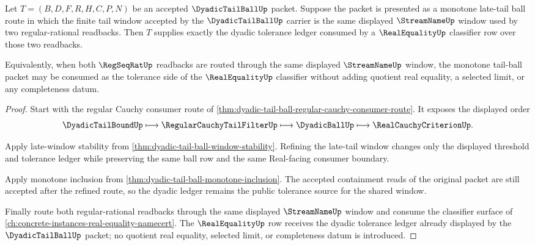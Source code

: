 \begin{theorem}
\label{thm:dyadic-tail-ball-real-equality-consumer}
Let $T=(B,D,F,R,H,C,P,N)$ be an accepted $\DyadicTailBallUp$ packet. Suppose the packet is presented as a monotone late-tail ball route in which the finite tail window accepted by the $\DyadicTailBallUp$ carrier is the same displayed $\StreamNameUp$ window used by two regular-rational readbacks. Then $T$ supplies exactly the dyadic tolerance ledger consumed by a $\RealEqualityUp$ classifier row over those two readbacks.

Equivalently, when both $\RegSeqRatUp$ readbacks are routed through the same displayed $\StreamNameUp$ window, the monotone tail-ball packet may be consumed as the tolerance side of the $\RealEqualityUp$ classifier without adding quotient real equality, a selected limit, or any completeness datum.
\end{theorem}
\begin{proof}
Start with the regular Cauchy consumer route of \autoref{thm:dyadic-tail-ball-regular-cauchy-consumer-route}. It exposes the displayed order
$$
\DyadicTailBoundUp \longmapsto \RegularCauchyTailFilterUp \longmapsto \DyadicBallUp \longmapsto \RealCauchyCriterionUp .
$$

Apply late-window stability from \autoref{thm:dyadic-tail-ball-window-stability}. Refining the late-tail window changes only the displayed threshold and tolerance ledger while preserving the same ball row and the same Real-facing consumer boundary.

Apply monotone inclusion from \autoref{thm:dyadic-tail-ball-monotone-inclusion}. The accepted containment reads of the original packet are still accepted after the refined route, so the dyadic ledger remains the public tolerance source for the shared window.

Finally route both regular-rational readbacks through the same displayed $\StreamNameUp$ window and consume the classifier surface of \autoref{ch:concrete-instances-real-equality-namecert}. The $\RealEqualityUp$ row receives the dyadic tolerance ledger already displayed by the $\DyadicTailBallUp$ packet; no quotient real equality, selected limit, or completeness datum is introduced.
\end{proof}

